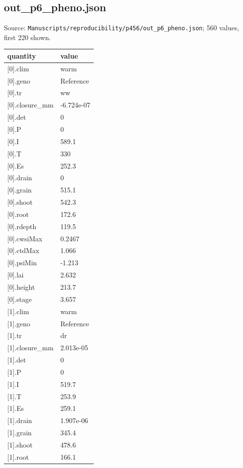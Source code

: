 \subsection*{out\_p6\_pheno.json}
\noindent\small Source: \nolinkurl{Manuscripts/reproducibility/p456/out_p6_pheno.json}; 560 values, first 220 shown.\par
{\scriptsize\begin{longtable}{p{}p{}}\toprule\textbf{quantity} & \textbf{value}\\\midrule\endhead
{}[0].clim & warm\\
{}[0].geno & Reference\\
{}[0].tr & ww\\
{}[0].closure\_mm & -6.724e-07\\
{}[0].det & 0\\
{}[0].P & 0\\
{}[0].I & 589.1\\
{}[0].T & 330\\
{}[0].Es & 252.3\\
{}[0].drain & 0\\
{}[0].grain & 515.1\\
{}[0].shoot & 542.3\\
{}[0].root & 172.6\\
{}[0].rdepth & 119.5\\
{}[0].cwsiMax & 0.2467\\
{}[0].ctdMax & 1.066\\
{}[0].psiMin & -1.213\\
{}[0].lai & 2.632\\
{}[0].height & 213.7\\
{}[0].stage & 3.657\\
{}[1].clim & warm\\
{}[1].geno & Reference\\
{}[1].tr & dr\\
{}[1].closure\_mm & 2.013e-05\\
{}[1].det & 0\\
{}[1].P & 0\\
{}[1].I & 519.7\\
{}[1].T & 253.9\\
{}[1].Es & 259.1\\
{}[1].drain & 1.907e-06\\
{}[1].grain & 345.4\\
{}[1].shoot & 478.6\\
{}[1].root & 166.1\\

\end{longtable}}
